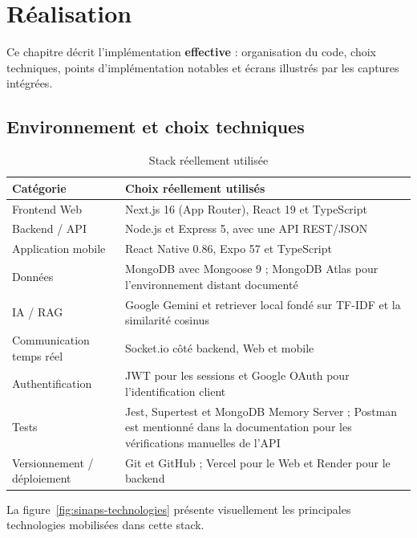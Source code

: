 \chapter{Réalisation}

Ce chapitre décrit l'implémentation \textbf{effective} : organisation du code, choix techniques, points d'implémentation notables et écrans illustrés par les captures intégrées.

\section{Environnement et choix techniques}

\begin{table}[H]
\centering
\caption{Stack réellement utilisée}
\label{tab:stack}
\begin{tabularx}{\textwidth}{|l|X|}
\hline
Catégorie & Choix réellement utilisés \\
\hline
Frontend Web & Next.js 16 (App Router), React 19 et TypeScript \\
\hline
Backend / API & Node.js et Express 5, avec une API REST/JSON \\
\hline
Application mobile & React Native 0.86, Expo 57 et TypeScript \\
\hline
Données & MongoDB avec Mongoose 9 ; MongoDB Atlas pour l'environnement distant documenté \\
\hline
IA / RAG & Google Gemini et retriever local fondé sur TF-IDF et la similarité cosinus \\
\hline
Communication temps réel & Socket.io côté backend, Web et mobile \\
\hline
Authentification & JWT pour les sessions et Google OAuth pour l'identification client \\
\hline
Tests & Jest, Supertest et MongoDB Memory Server ; Postman est mentionné dans la documentation pour les vérifications manuelles de l'API \\
\hline
Versionnement / déploiement & Git et GitHub ; Vercel pour le Web et Render pour le backend \\
\hline
\end{tabularx}
\end{table}

La figure~\ref{fig:sinaps-technologies} présente visuellement les principales technologies mobilisées dans cette stack.

